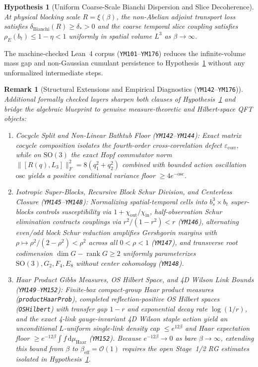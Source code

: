 \documentclass[11pt,a4paper]{article}
\newtheorem{remark}[theorem]{Remark}
\newtheorem{hypothesis}{Hypothesis}[section]
\begin{document}
\begin{hypothesis}[Uniform Coarse-Scale Bianchi Dispersion and Slice Decoherence]
\label{hyp:p4-crossover}
At physical blocking scale $R = \xi(\beta)$, the non-Abelian adjoint transport loss satisfies $\delta_{\mathrm{Bianchi}}(R) \ge \delta_* > 0$ and the coarse temporal slice coupling satisfies $\rho_E(b_t) \le 1 - \eta < 1$ uniformly in spatial volume $L^3$ as $\beta \to \infty$.
\end{hypothesis}

The machine-checked Lean~4 corpus (\texttt{YM101}--\texttt{YM176}) reduces the infinite-volume mass gap and non-Gaussian cumulant persistence to Hypothesis~\ref{hyp:p4-crossover} without any unformalized intermediate steps.

\begin{remark}[Structural Extensions and Empirical Diagnostics (\texttt{YM142}--\texttt{YM176})]
Additional formally checked layers sharpen both clauses of Hypothesis~\ref{hyp:p4-crossover} and bridge the algebraic blueprint to genuine measure-theoretic and Hilbert-space QFT objects:
\begin{enumerate}
\item \emph{Cocycle Split and Non-Linear Bathtub Floor (\texttt{YM142}--\texttt{YM144}):} Exact matrix cocycle composition isolates the fourth-order cross-correlation defect $\varepsilon_{\mathrm{corr}}$, while on $\mathrm{SO}(3)$ the exact Hopf commutator norm $\|[R(q),L_3]\|_F^2 = 8(q_1^2 + q_2^2)$ combined with bounded action oscillation $\mathrm{osc}$ yields a positive conditional variance floor $\ge 4 e^{-\mathrm{osc}}$.
\item \emph{Isotropic Super-Blocks, Recursive Block Schur Division, and Centerless Closure (\texttt{YM145}--\texttt{YM148}):} Normalizing spatial-temporal cells into $b_s^3 \times b_t$ super-blocks controls susceptibility via $1 + \chi_{\mathrm{out}}/\chi_{\mathrm{in}}$, half-observation Schur elimination contracts couplings via $r^2/(1 - r^2) < r$ (\texttt{YM146}), alternating even/odd block Schur reduction amplifies Gershgorin margins with $\rho \mapsto \rho^2/(2 - \rho^2) < \rho^2$ across all $0 < \rho < 1$ (\texttt{YM147}), and transverse root codimension $\dim G - \operatorname{rank} G \ge 2$ uniformly parameterizes $\mathrm{SO}(3), G_2, F_4, E_8$ without center cohomology (\texttt{YM148}).
\item \emph{Haar Product Gibbs Measures, OS Hilbert Space, and 4D Wilson Link Bounds (\texttt{YM149}--\texttt{YM152}):} Finite-box compact-group Haar product measures (\texttt{productHaarProb}), completed reflection-positive OS Hilbert spaces (\texttt{OSHilbert}) with transfer gap $1 - r$ and exponential decay rate $\log(1/r)$, and the exact 4-link gauge-invariant 4D Wilson staple action yield an unconditional $L$-uniform single-link density cap $\le e^{12\beta}$ and Haar expectation floor $\ge e^{-12\beta} \int f\,\mathrm{d}\mu_{\mathrm{Haar}}$ (\texttt{YM152}). Because $e^{-12\beta} \to 0$ as bare $\beta \to \infty$, extending this bound from $\beta$ to $\beta_{\mathrm{eff}} = \mathcal{O}(1)$ requires the open Stage~1/2 RG estimates isolated in Hypothesis~\ref{hyp:p4-crossover}.

\end{enumerate}
\end{remark}
\end{document}
